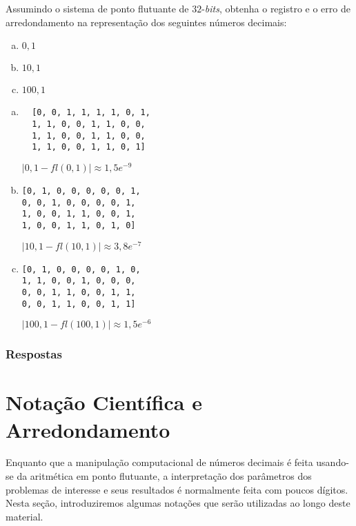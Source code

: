 \begin{exer}
  Assumindo o sistema de ponto flutuante de $32$-{\it bits}, obtenha o registro e o erro de arredondamento na representação dos seguintes números decimais:
  \begin{enumerate}[a)]
  \item $0,1$
  \item $10,1$
  \item $100,1$
  \end{enumerate}
\end{exer}
\begin{resp}
  \begin{enumerate}[a)]
  \item %
\begin{verbatim}
  [0, 0, 1, 1, 1, 1, 0, 1,
  1, 1, 0, 0, 1, 1, 0, 0,
  1, 1, 0, 0, 1, 1, 0, 0,
  1, 1, 0, 0, 1, 1, 0, 1]
\end{verbatim}

$|0,1 - fl(0,1)| \approx 1,5e^{-9}$

\item %
\begin{verbatim}
[0, 1, 0, 0, 0, 0, 0, 1,
0, 0, 1, 0, 0, 0, 0, 1,
1, 0, 0, 1, 1, 0, 0, 1,
1, 0, 0, 1, 1, 0, 1, 0]
\end{verbatim}
$|10,1 - fl(10,1)| \approx 3,8e^{-7}$

\item %
\begin{verbatim}
[0, 1, 0, 0, 0, 0, 1, 0,
1, 1, 0, 0, 1, 0, 0, 0,
0, 0, 1, 1, 0, 0, 1, 1,
0, 0, 1, 1, 0, 0, 1, 1]
\end{verbatim}
$|100,1 - fl(100,1)| \approx 1,5e^{-6}$
  \end{enumerate}
\end{resp}

\ifisbook
\subsubsection{Respostas}
\shipoutAnswer
\fi


\section{Notação Científica e Arredondamento}\label{cap_aritm_sec_notcient}

Enquanto que a manipulação computacional de números decimais é feita usando-se da aritmética em ponto flutuante, a interpretação dos parâmetros dos problemas de interesse e seus resultados é normalmente feita com poucos dígitos. Nesta seção, introduziremos algumas notações que serão utilizadas ao longo deste material.

